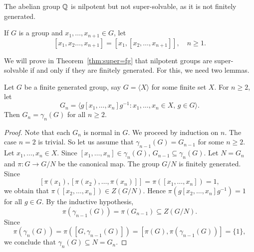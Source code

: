 %

\begin{example}
The abelian group $\mathbb{Q}$ is nilpotent but not super-solvable, 
as it is not finitely generated. 
\end{example}


If $G$ is a group and $x_1,\dots,x_{n+1}\in G$, 
let 
\[
[x_1,x_2\dots,x_{n+1}]=\left[ x_1,[x_2,\dots,x_{n+1}]\right],\quad
n\geq1.
\]

We will prove in Theorem~\ref{thm:super=fg} that nilpotent groups are super-solvable 
if and only if they are finitely generated. For this, we need two lemmas. 

\begin{lemma}
	\label{lem:G_n}
	Let $G$ be a finite generated group, say $G=\langle X\rangle$ for some finite set $X$.  
	For $n\geq2$, let 
 	\[
		G_n=\langle g[x_1,\dots,x_n]g^{-1}:x_1,\dots,x_n\in X,\,g\in G\rangle.
	\]
	Then $G_n=\gamma_n(G)$ for all $n\geq2$. 
\end{lemma}

\begin{proof}
	Note that each $G_n$ is normal in $G$. We proceed by induction on $n$. The case 
    $n=2$ is trivial. So let us assume that 
    $\gamma_{n-1}(G)=G_{n-1}$ for some $n\geq2$. Let $x_1,\dots,x_n\in X$. Since 
	$[x_1,\dots,x_n]\in\gamma_{n}(G)$, $G_{n-1}\subseteq\gamma_n(G)$. Let 
	$N=G_n$ and $\pi\colon G\to G/N$ be the canonical map. The group $G/N$ is finitely generated. Since 
	\[
	[\pi(x_1),[\pi(x_2),\dots,\pi(x_{n})]]=\pi([x_1,\dots,x_n])=1,
	\]
	we obtain that $\pi([x_2,\dots,x_{n}])\in Z(G/N)$. Hence 
	$\pi(g[x_2,\dots,x_n]g^{-1})=1$ for all $g\in G$. By the inductive hypothesis, 
 	\[
	\pi(\gamma_{n-1}(G))=\pi(G_{n-1})\subseteq Z(G/N).
	\]
	Since  
	\[
	\pi(\gamma_{n}(G))=\pi([G,\gamma_{n-1}(G)])=[\pi(G),\pi(\gamma_{n-1}(G))]=\{1\},
	\]
	we conclude that $\gamma_n(G)\subseteq N=G_n$.
\end{proof}

